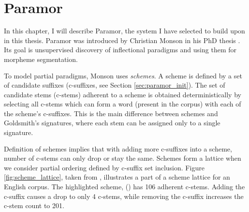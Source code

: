 \chapter{Paramor}\label{chapter:paramor}
In this chapter, I will describe Paramor, the system I have selected to build upon in this thesis. Paramor was introduced by Christian Monson in his PhD thesis \citep{monson09}. Its goal is unsupervised discovery of inflectional paradigms and using them for morpheme segmentation. 

To model partial paradigms, Monson uses \emph{schemes}. A scheme is defined by a set of candidate suffixes (c-suffixes, see Section \ref{sec:paramor_init}). The set of candidate stems (c-stems) adherent to a scheme is obtained deterministically by selecting all c-stems which can form a word (present in the corpus) with each of the scheme's c-suffixes. This is the main difference between schemes and Goldsmith's signatures, where each stem can be assigned only to a single signature.

Definition of schemes implies that with adding more c-suffixes into a scheme, number of c-stems can only drop or stay the same. Schemes form a lattice when we consider partial ordering defined by c-suffix set inclusion. Figure \ref{fig:scheme_lattice}, taken from \citep{monson09}, illustrates a part of a scheme lattice for an English corpus. The highlighted scheme, () has 106 adherent c-stems. Adding the c-suffix  causes a drop to only 4 c-stems, while removing the c-suffix  increases the c-stem count to 201.

